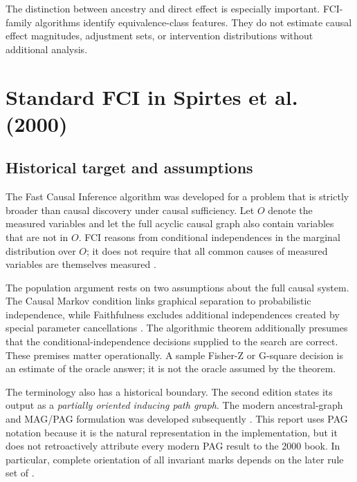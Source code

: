 \documentclass[11pt,a4paper,oneside]{report}
\begin{document}
The distinction between ancestry and direct effect is especially important.
FCI-family algorithms identify equivalence-class features. They do not
estimate causal effect magnitudes, adjustment sets, or intervention
distributions without additional analysis.

\chapter{Standard FCI in Spirtes et al. (2000)}
\label{chap:standard-fci-source}

\section{Historical target and assumptions}

The Fast Causal Inference algorithm was developed for a problem that is
strictly broader than causal discovery under causal sufficiency.  Let \(O\)
denote the measured variables and let the full acyclic causal graph also
contain variables that are not in \(O\).  FCI reasons from conditional
independences in the marginal distribution over \(O\); it does not require
that all common causes of measured variables are themselves measured
\citep[Chapter~6, \S\S6.3 and 6.7, pp.~129--130 and 139]
{spirtes2000causation}.

The population argument rests on two assumptions about the full causal system.
The Causal Markov condition links graphical separation to probabilistic
independence, while Faithfulness excludes additional independences created by
special parameter cancellations
\citep[Chapter~3, \S\S3.4.1 and 3.4.3, pp.~29--31]
{spirtes2000causation}.  The algorithmic theorem additionally presumes that
the conditional-independence decisions supplied to the search are correct.
These premises matter operationally.  A sample Fisher-Z or G-square decision
is an estimate of the oracle answer; it is not the oracle assumed by the
theorem.

The terminology also has a historical boundary.  The second edition states
its output as a \emph{partially oriented inducing path graph}.  The modern
ancestral-graph and MAG/PAG formulation was developed subsequently
\citep{richardson2002ancestral}.  This report uses PAG notation because it is
the natural representation in the implementation, but it does not retroactively
attribute every modern PAG result to the 2000 book.  In particular, complete
orientation of all invariant marks depends on the later rule set of
\citet{zhang2008completeness}.
\end{document}
